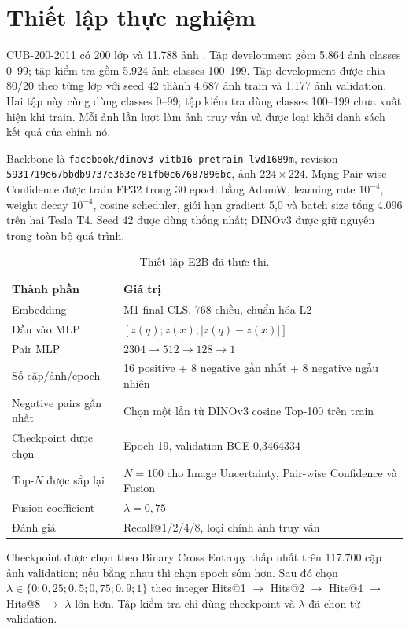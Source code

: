 \documentclass[11pt,a4paper]{article}
\begin{document}
\section{Thiết lập thực nghiệm}
CUB-200-2011 có 200 lớp và 11.788 ảnh \cite{wah2011cub}. Tập development
gồm 5.864 ảnh classes 0--99; tập kiểm tra gồm 5.924 ảnh classes 100--199.
Tập development được chia 80/20 theo từng lớp với seed 42 thành 4.687 ảnh
train và 1.177 ảnh validation. Hai tập này cùng dùng classes 0--99; tập kiểm
tra dùng classes 100--199 chưa xuất hiện khi train. Mỗi ảnh lần lượt làm ảnh
truy vấn và được loại khỏi danh sách kết quả của chính nó.

Backbone là \texttt{facebook/dinov3-vitb16-pretrain-lvd1689m}, revision
\texttt{5931719e67bbdb9737e363e781fb0c67687896bc}, ảnh $224\times224$.
Mạng Pair-wise Confidence được train FP32 trong 30 epoch bằng AdamW, learning
rate $10^{-4}$, weight decay $10^{-4}$, cosine scheduler, giới hạn gradient
5,0 và batch size tổng 4.096 trên hai Tesla T4. Seed 42 được dùng thống nhất;
DINOv3 được giữ nguyên trong toàn bộ quá trình.

\begin{table}[htbp]
\centering
\caption{Thiết lập E2B đã thực thi.}
\begin{tabular}{@{}ll@{}}
\toprule Thành phần & Giá trị\\ \midrule
Embedding & M1 final CLS, 768 chiều, chuẩn hóa L2\\
Đầu vào MLP & $[z(q);z(x);|z(q)-z(x)|]$\\
Pair MLP & $2304\rightarrow512\rightarrow128\rightarrow1$\\
Số cặp/ảnh/epoch & 16 positive + 8 negative gần nhất + 8 negative ngẫu nhiên\\
Negative pairs gần nhất & Chọn một lần từ DINOv3 cosine Top-100 trên train\\
Checkpoint được chọn & Epoch 19, validation BCE 0,3464334\\
Top-$N$ được sắp lại & $N=100$ cho Image Uncertainty, Pair-wise Confidence và Fusion\\
Fusion coefficient & $\lambda=0{,}75$\\
Đánh giá & Recall@1/2/4/8, loại chính ảnh truy vấn\\
\bottomrule
\end{tabular}
\end{table}

Checkpoint được chọn theo Binary Cross Entropy thấp nhất trên 117.700 cặp
ảnh validation; nếu bằng nhau thì chọn epoch sớm hơn. Sau đó chọn
$\lambda\in\{0;0{,}25;0{,}5;0{,}75;0{,}9;1\}$ theo integer Hits@1
$\rightarrow$ Hits@2 $\rightarrow$ Hits@4 $\rightarrow$ Hits@8
$\rightarrow$ $\lambda$ lớn hơn. Tập kiểm tra chỉ dùng checkpoint và
$\lambda$ đã chọn từ validation.
\end{document}
